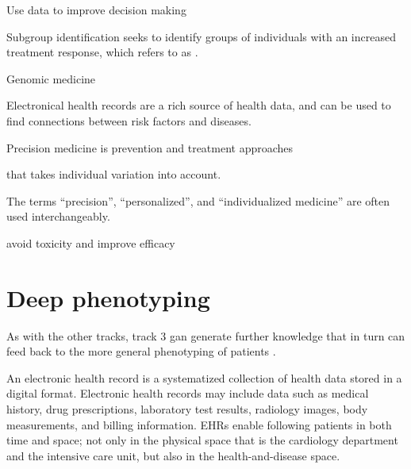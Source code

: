 Use data to improve decision making

Subgroup identification seeks to identify groups of individuals with an
increased treatment response, which
\citeauthor{kosorokPrecision2019} refers to as 
.


Genomic medicine

Electronical health records are a rich source of health data,
and can be used to find connections between risk factors and diseases.

Precision medicine is prevention and treatment approaches

that takes individual variation into account.


The terms
\enquote{precision},
\enquote{personalized},
and \enquote{individualized medicine}
are often used interchangeably.

avoid toxicity and improve efficacy

\section{Deep phenotyping} \label{deep-pheno}



As with the other tracks, track 3 gan generate further knowledge 
that in turn can feed back to the more general phenotyping of patients
\autocite{konigWhat2017}. 

An electronic health record
is a systematized collection of health data 
stored in a digital format.
Electronic health records may include data such as
medical history, drug prescriptions, laboratory test results,
radiology images, body measurements, and billing information.
EHRs enable following patients in both time and space;
not only in the physical space that is the cardiology department
and the intensive care unit, but also in the health-and-disease space.

